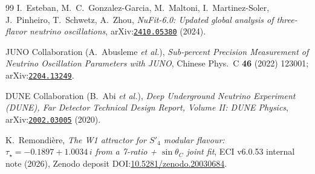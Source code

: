 \documentclass[a4paper,11pt]{article}
\newcommand{\arXiv}[1]{\href{https://arxiv.org/abs/#1}{\texttt{#1}}}
\begin{document}
\begin{thebibliography}{99}
I.~Esteban, M.~C.~Gonzalez-Garcia, M.~Maltoni, I.~Martinez-Soler,
J.~Pinheiro, T.~Schwetz, A.~Zhou,
\emph{NuFit-6.0: Updated global analysis of three-flavor neutrino
oscillations}, arXiv:\arXiv{2410.05380} (2024).

JUNO Collaboration (A.~Abusleme \emph{et al.}),
\emph{Sub-percent Precision Measurement of Neutrino Oscillation
Parameters with JUNO},
Chinese Phys.~C \textbf{46} (2022) 123001;
arXiv:\arXiv{2204.13249}.

DUNE Collaboration (B.~Abi \emph{et al.}),
\emph{Deep Underground Neutrino Experiment (DUNE), Far Detector
Technical Design Report, Volume II: DUNE Physics},
arXiv:\arXiv{2002.03005} (2020).

K.~Remondi\`{e}re,
\emph{The W1 attractor for $S'_4$ modular flavour: $\tau_\star =
-0.1897 + 1.0034\,i$ from a 7-ratio + $\sin\theta_C$ joint fit},
ECI v6.0.53 internal note (2026), Zenodo deposit
DOI:\href{https://doi.org/10.5281/zenodo.20030684}{10.5281/zenodo.20030684}.

\end{thebibliography}
\end{document}
